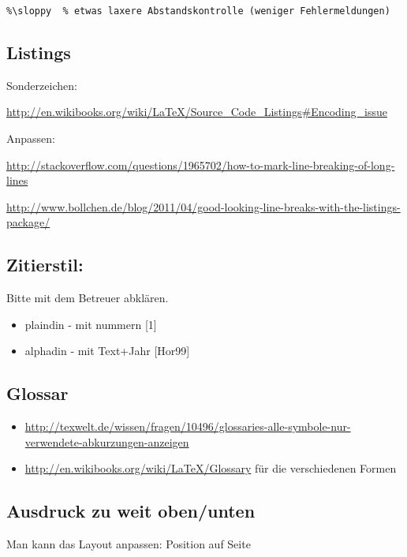 \begin{lstlisting}
%\sloppy  % etwas laxere Abstandskontrolle (weniger Fehlermeldungen)
\end{lstlisting}

\subsection{Listings}\label{listings}

Sonderzeichen:

\url{http://en.wikibooks.org/wiki/LaTeX/Source_Code_Listings\#Encoding_issue}

Anpassen:

\url{http://stackoverflow.com/questions/1965702/how-to-mark-line-breaking-of-long-lines}

\url{http://www.bollchen.de/blog/2011/04/good-looking-line-breaks-with-the-listings-package/}

\subsection{Zitierstil:}\label{zitierstil}

Bitte mit dem Betreuer abklären.

\begin{itemize}
\tightlist
\item
  plaindin - mit nummern {[}1{]}
\item
  alphadin - mit Text+Jahr {[}Hor99{]}
\end{itemize}

\subsection{Glossar}\label{glossar}

\begin{itemize}
\tightlist
\item
  \url{http://texwelt.de/wissen/fragen/10496/glossaries-alle-symbole-nur-verwendete-abkurzungen-anzeigen}
\item
  \url{http://en.wikibooks.org/wiki/LaTeX/Glossary} für die
  verschiedenen Formen
\end{itemize}

\subsection{Ausdruck zu weit
oben/unten}\label{ausdruck-zu-weit-obenunten}

Man kann das Layout anpassen: Position auf Seite

